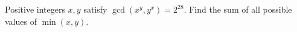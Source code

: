 Positive integers $x,y$ satisfy $\gcd(x^y,y^x)=2^{28}$. Find the sum of all possible values of $\min(x,y)$.
